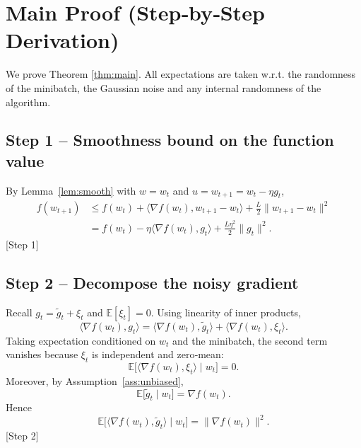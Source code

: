 \documentclass{article}
\newcommand{\E}{\mathbb{E}}
\begin{document}
\section*{Main Proof (Step‑by‑Step Derivation)}
We prove Theorem \ref{thm:main}.  All expectations are taken w.r.t. the
randomness of the minibatch, the Gaussian noise and any internal
randomness of the algorithm.

\subsection*{Step 1 – Smoothness bound on the function value}
By Lemma~\ref{lem:smooth} with $w=w_t$ and $u=w_{t+1}=w_t-\eta g_t$,
\begin{align}
f(w_{t+1})
&\le f(w_t)+\langle\nabla f(w_t),w_{t+1}-w_t\rangle
      +\frac{L}{2}\|w_{t+1}-w_t\|^2                         \nonumber\\
&= f(w_t)-\eta\langle\nabla f(w_t),g_t\rangle
   +\frac{L\eta^2}{2}\|g_t\|^2 .                              \tag{4}
\end{align}
[Step 1]

\subsection*{Step 2 – Decompose the noisy gradient}
Recall $g_t=\tilde g_t+\xi_t$ and $\E[\xi_t]=0$.  Using linearity of inner
products,
\[
\langle\nabla f(w_t),g_t\rangle
= \langle\nabla f(w_t),\tilde g_t\rangle
  +\langle\nabla f(w_t),\xi_t\rangle .                       \tag{5}
\]
Taking expectation conditioned on $w_t$ and the minibatch,
the second term vanishes because $\xi_t$ is independent and zero‑mean:
\[
\E\!\bigl[\langle\nabla f(w_t),\xi_t\rangle\mid w_t\bigr]=0 .
\] 
Moreover, by Assumption~\ref{ass:unbiased},
\[
\E\!\bigl[\tilde g_t\mid w_t\bigr]=\nabla f(w_t).
\] 
Hence
\[
\E\!\bigl[\langle\nabla f(w_t),\tilde g_t\rangle\mid w_t\bigr]
   =\|\nabla f(w_t)\|^2 .                                    \tag{6}
\]
[Step 2]
\end{document}

